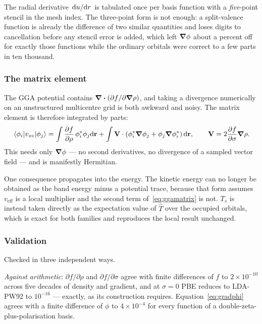 \documentclass[11pt,a4paper]{article}
\begin{document}
The radial derivative $\dv*{u}{r}$ is tabulated once per basis function with a
\emph{five}-point stencil in the mesh index. The three-point form is not
enough: a split-valence function is already the difference of two similar
quantities and loses digits to cancellation before any stencil error is added,
which left $\grad\phi$ about a percent off for exactly those functions while
the ordinary orbitals were correct to a few parts in ten thousand.

\subsubsection{The matrix element}

The GGA potential contains $\div(\partial f/\partial\grad\rho)$, and taking a
divergence numerically on an unstructured multicentre grid is both awkward and
noisy. The matrix element is therefore integrated by parts:
\begin{equation}
  \mel{\phi_i}{v_{xc}}{\phi_j} =
    \int \pdv{f}{\rho}\,\phi_i^{*}\phi_j \dd\vb{r}
    + \int \vb{V}\cdot\left( \phi_i^{*}\grad\phi_j
                           + \phi_j\grad\phi_i^{*} \right) \dd\vb{r},
  \qquad
  \vb{V} = 2\pdv{f}{\sigma}\grad\rho .
  \label{eq:ggamatrix}
\end{equation}
This needs only $\grad\phi$ --- no second derivatives, no divergence of a
sampled vector field --- and is manifestly Hermitian.

One consequence propagates into the energy. The kinetic energy can no longer
be obtained as the band energy minus a potential trace, because that form
assumes $v_{\text{eff}}$ is a local multiplier and the second term
of~\eqref{eq:ggamatrix} is not. $T_s$ is instead taken directly as the
expectation value of $\hat{T}$ over the occupied orbitals, which is exact for
both families and reproduces the local result unchanged.

\subsubsection{Validation}

Checked in three independent ways.

\emph{Against arithmetic}: $\partial f/\partial\rho$ and
$\partial f/\partial\sigma$ agree with finite differences of $f$ to
$2\times10^{-10}$ across five decades of density and gradient, and at
$\sigma = 0$ PBE reduces to LDA-PW92 to $10^{-16}$ --- exactly, as its
construction requires. Equation~\eqref{eq:gradphi} agrees with a finite
difference of $\phi$ to $4\times10^{-4}$ for every function of a
double-zeta-plus-polarisation basis.
\end{document}
